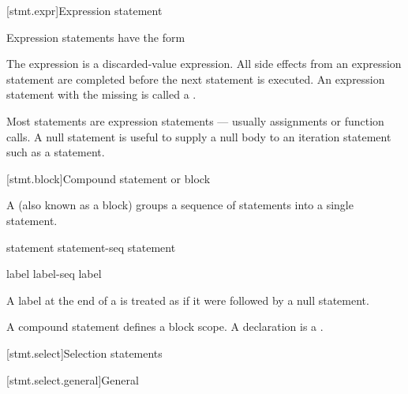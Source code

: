 [stmt.expr]{Expression statement}%

\pnum
Expression statements have the form
\begin{bnf}
\br
     \terminal{;}
\end{bnf}

The expression is
a discarded-value expression.
All
%
side effects from an expression statement
are completed before the next statement is executed.
%
An expression statement with the  missing is called
a .
\begin{note}
Most statements are expression statements --- usually assignments or
function calls. A null statement is useful to supply a null body to an
iteration statement such as a 
statement.
\end{note}

[stmt.block]{Compound statement or block}%
%

\pnum
A  (also known as a block) groups a
sequence of statements into a single statement.

\begin{bnf}
\br
    \terminal{\{}   \terminal{\}}
\end{bnf}

\begin{bnf}
\br
    statement\br
    statement-seq statement
\end{bnf}

\begin{bnf}
\br
    label\br
    label-seq label
\end{bnf}

A label at the end of a 
is treated as if it were followed by a null statement.

\pnum
\begin{note}
A compound statement defines a block scope.
A declaration is a .
\end{note}

[stmt.select]{Selection statements}%

[stmt.select.general]{General}%

